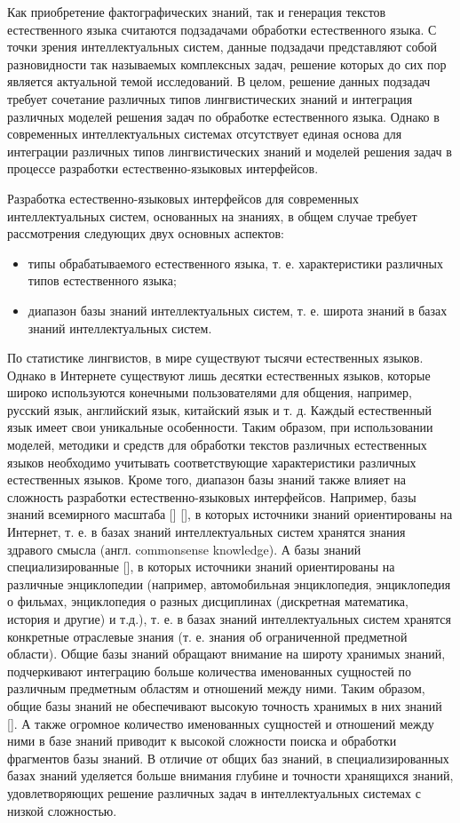 Как приобретение фактографических знаний, так и генерация текстов естественного языка считаются подзадачами обработки естественного языка. С точки зрения интеллектуальных систем, данные подзадачи представляют собой разновидности так называемых комплексных задач, решение которых до сих пор является актуальной темой исследований. В целом, решение данных подзадач требует сочетание различных типов лингвистических знаний и интеграция различных моделей решения задач по обработке естественного языка. Однако в современных интеллектуальных системах отсутствует единая основа для интеграции различных типов лингвистических знаний и моделей решения задач в процессе разработки естественно-языковых интерфейсов.

Разработка естественно-языковых интерфейсов для современных интеллектуальных систем, основанных на знаниях, в общем случае требует рассмотрения следующих двух основных аспектов:
\begin{itemize}
	\item типы обрабатываемого естественного языка, т. е. характеристики различных типов естественного языка;
	\item диапазон базы знаний интеллектуальных систем, т. е. широта знаний в базах знаний интеллектуальных систем.
\end{itemize}

По статистике лингвистов, в мире существуют тысячи естественных языков. Однако в Интернете существуют лишь десятки естественных языков, которые широко используются конечными пользователями для общения, например, русский язык, английский язык, китайский язык и т. д. Каждый естественный язык имеет свои уникальные особенности. Таким образом, при использовании моделей, методики и средств для обработки текстов различных естественных языков необходимо учитывать соответствующие характеристики различных естественных языков. Кроме того, диапазон базы знаний также влияет на сложность разработки естественно-языковых интерфейсов. Например, базы знаний всемирного масштаба [] [], в которых источники знаний ориентированы на Интернет, т. е. в базах знаний интеллектуальных систем хранятся знания здравого смысла (англ. commonsense knowledge). А базы знаний специализированные [], в которых источники знаний ориентированы на различные энциклопедии (например, автомобильная энциклопедия, энциклопедия о фильмах, энциклопедия о разных дисциплинах (дискретная математика, история и другие) и т.д.), т. е. в базах знаний интеллектуальных систем хранятся конкретные отраслевые знания (т. е. знания об ограниченной предметной области). Общие базы знаний обращают внимание на широту хранимых знаний, подчеркивают интеграцию больше количества именованных сущностей по различным предметным областям и отношений между ними. Таким образом, общие базы знаний не обеспечивают высокую точность хранимых в них знаний []. А также огромное количество именованных сущностей и отношений между ними в базе знаний приводит к высокой сложности поиска и обработки фрагментов базы знаний. В отличие от общих баз знаний, в специализированных базах знаний уделяется больше внимания глубине и точности хранящихся знаний, удовлетворяющих решение различных задач в интеллектуальных системах с низкой сложностью. 

